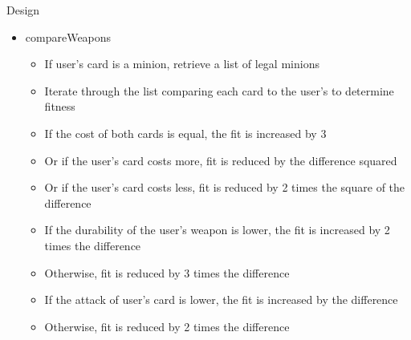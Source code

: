 \documentclass[aspectratio=169]{beamer}
\begin{document}
\begin{frame}[allowframebreaks]{Design}
\begin{itemize}
\pagebreak
\item compareWeapons
\begin{itemize}
\item If user's card is a minion, retrieve a list of legal minions
\item Iterate through the list comparing each card to the user's to determine fitness
\item If the cost of both cards is equal, the fit is increased by 3
\item Or if the user's card costs more, fit is reduced by the difference squared
\item Or if the user's card costs less, 
fit is reduced by 2 times the square of the difference
\item If the durability of the user's weapon is lower, the fit is increased by 2
times the difference
\item Otherwise, fit is reduced by 3 times the difference
\item If the attack of user's card is lower, the fit is increased by the difference
\item Otherwise, fit is reduced by 2 times the difference
\end{itemize}

\end{itemize}
\end{frame}
\end{document}
